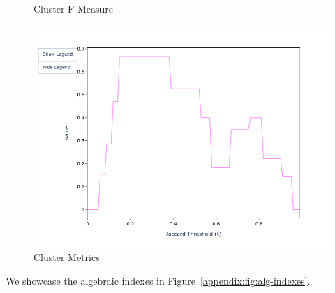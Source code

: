 \documentclass{article}
\begin{document}
\begin{figure}[htbp]
\begin{minipage}{0.32\textwidth}
            \caption*{Cluster F Measure}
            \includegraphics[width=\textwidth]{sample-usage/mini-alg-cf}
        \end{minipage}
        \caption{Cluster Metrics}\label{appendix:fig:alg-cluster}
    \end{figure}

    We showcase the algebraic indexes in Figure~\ref{appendix:fig:alg-indexes}.
\end{document}

